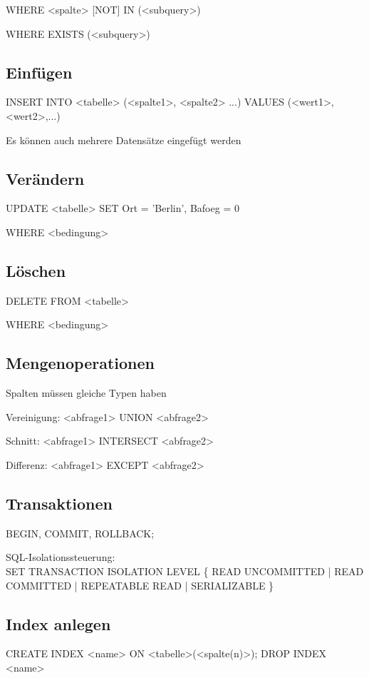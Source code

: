 WHERE <spalte> [NOT] IN (<subquery>)

WHERE EXISTS (<subquery>)\\


\subsection{Einfügen}
INSERT INTO <tabelle> (<spalte1>, <spalte2> ...) VALUES (<wert1>, <wert2>,...)

Es können auch mehrere Datensätze eingefügt werden

\subsection{Verändern}
UPDATE <tabelle> SET Ort = 'Berlin', Bafoeg = 0 

WHERE <bedingung>

\subsection{Löschen}
DELETE FROM <tabelle> 

WHERE <bedingung>

\subsection{Mengenoperationen}
Spalten müssen gleiche Typen haben
 
Vereinigung: <abfrage1> UNION <abfrage2>  

Schnitt: <abfrage1> INTERSECT <abfrage2> 

Differenz: <abfrage1> EXCEPT <abfrage2>

\subsection{Transaktionen}
BEGIN, COMMIT, ROLLBACK;

SQL-Isolationssteuerung: \\
SET TRANSACTION ISOLATION LEVEL \{ READ UNCOMMITTED | READ COMMITTED | REPEATABLE READ | SERIALIZABLE \}

\subsection{Index anlegen}
CREATE INDEX <name> ON 	<tabelle>(<spalte(n)>); DROP INDEX <name>
